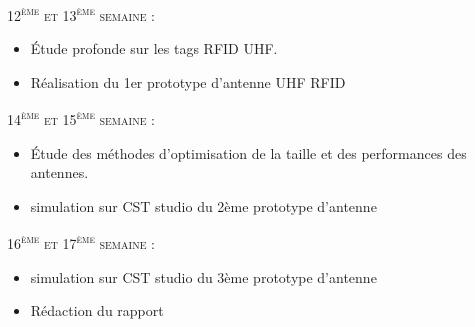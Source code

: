 \documentclass[11pt, a4paper, twoside]{book}
\begin{document}
\textsc{12\textsuperscript{ème} et 13\textsuperscript{ème} semaine :}
\begin{itemize}
\item Étude profonde sur les tags RFID UHF.
\item Réalisation du 1er prototype d'antenne UHF RFID
\end{itemize}
\textsc{14\textsuperscript{ème} et 15\textsuperscript{ème} semaine :}
\begin{itemize}
\item Étude des méthodes d'optimisation de la taille et des performances des antennes.
\item simulation sur CST studio du 2ème prototype d'antenne
\end{itemize}
\textsc{16\textsuperscript{ème} et 17\textsuperscript{ème} semaine :}
\begin{itemize}
\item simulation sur CST studio du 3ème prototype d'antenne
\item Rédaction du rapport
\end{itemize}
\pagebreak
\end{document}
